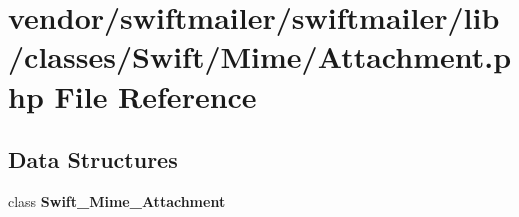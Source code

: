 \section{vendor/swiftmailer/swiftmailer/lib/classes/\+Swift/\+Mime/\+Attachment.php File Reference}
\label{_mime_2_attachment_8php}
\subsection*{Data Structures}
\begin{DoxyCompactItemize}
\item 
class {\bf Swift\+\_\+\+Mime\+\_\+\+Attachment}
\end{DoxyCompactItemize}
